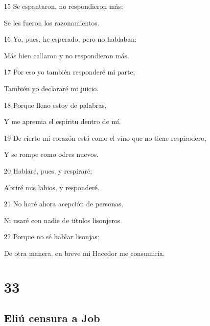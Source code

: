 \par 15 Se espantaron, no respondieron más;
\par Se les fueron los razonamientos.
\par 16 Yo, pues, he esperado, pero no hablaban;
\par Más bien callaron y no respondieron más.
\par 17 Por eso yo también responderé mi parte;
\par También yo declararé mi juicio. 
\par 18 Porque lleno estoy de palabras, 
\par Y me apremia el espíritu dentro de mí.
\par 19 De cierto mi corazón está como el vino que no tiene respiradero,
\par Y se rompe como odres nuevos.
\par 20 Hablaré, pues, y respiraré;
\par Abriré mis labios, y responderé.
\par 21 No haré ahora acepción de personas,
\par Ni usaré con nadie de títulos lisonjeros.
\par 22 Porque no sé hablar lisonjas;
\par De otra manera, en breve mi Hacedor me consumiría.

\chapter{33}

\section*{Eliú censura a Job}

